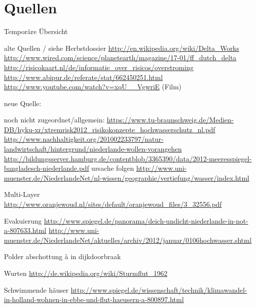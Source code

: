 \part{Quellen}
Temporäre Übersicht


alte Quellen  / siehe Herbstdossier
\url{http://en.wikipedia.org/wiki/Delta_Works}
\url{http://www.wired.com/science/planetearth/magazine/17-01/ff_dutch_delta}
\url{http://risicokaart.nl/de/informatie_over_risicos/overstroming}
\url{http://www.abipur.de/referate/stat/662450251.html}
\url{http://www.youtube.com/watch?v=xqU__VgwriE} (Film)


neue Quelle:

noch nicht zugeordnet/allgemein:
\url{https://www.tu-braunschweig.de/Medien-DB/hyku-xr/xtremrisk2012_risikokonzepte_hochwasserschutz_nl.pdf}
\url{http://www.nachhaltigkeit.org/201002233797/natur-landwirtschaft/hintergrund/niederlande-wollen-vorangehen}
\url{http://bildungsserver.hamburg.de/contentblob/3365390/data/2012-meeresspiegel-bangladesch-niederlande.pdf} ursache folgen
\url{http://www.uni-muenster.de/NiederlandeNet/nl-wissen/geographie/vertiefung/wasser/index.html}



Multi-Layer \url{http://www.oranjewoud.nl/sites/default/oranjewoud_files/3_32556.pdf}

 Evakuierung
      \url{ http://www.spiegel.de/panorama/deich-undicht-niederlande-in-not-a-807633.html}
       \url{http://www.uni-muenster.de/NiederlandeNet/aktuelles/archiv/2012/januar/0106hochwasser.shtml}

       Polder abschottung à in dijkdoorbraak

       Wurten \url{http://de.wikipedia.org/wiki/Sturmflut_1962}

       Schwimmende häuser \url{http://www.spiegel.de/wissenschaft/technik/klimawandel-in-holland-wohnen-in-ebbe-und-flut-haeusern-a-800897.html}



